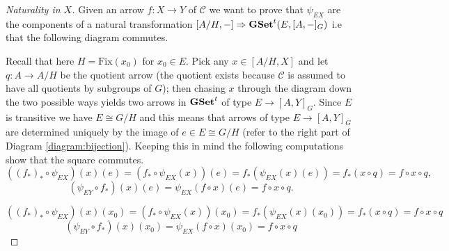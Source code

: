 \documentclass[italian, 12pt, reqno]{article}
\theoremstyle{myteo}
\numberwithin{equation}{section}
\newcommand{\cat}[1]{\mathscr{#1}}
\newcommand{\tgset}{\text{\textbf{GSet}}^t}
\newcommand{\fix}[1]{\text{Fix}(#1)}
\newcommand{\homs}[2]{[#1, #2]}
\newcommand{\fun}[3]{#1\colon#2\to #3}
\begin{document}
\begin{proof}[Naturality in \(X\)]
  \label{proof:naturality_in_X}
  Given an arrow \(\fun{f}{X}{Y}\) of \(\cat{C}\) we want to prove that \(\psi_{EX}\) are the components of a natural transformation \(\homs{A/H}{-}\Rightarrow \tgset(E, \homs{A}{-}_G)\) i.e that the following diagram commutes.
  \begin{center}
  \end{center}
  Recall that here \(H = \fix{x_0}\) for \(x_0\in E\).
  Pick any \(x\in \homs{A/H}{X}\) and let \(\fun{q}{A}{A/H}\) be the quotient arrow (the quotient exists because \(\cat{C}\) is assumed to have all quotients by subgroups of \(G\)); then chasing \(x\) through the diagram down the two possible ways yields two arrows in \(\tgset\) of type \(E\to\homs{A}{Y}_G\).
  Since \(E\) is transitive we have \(E \cong G/H\) and this means that arrows of type \(E\to\homs{A}{Y}_G\) are determined uniquely by the image of \(e\in E \cong G/H\) (refer to the right part of Diagram \ref{diagram:bijection}).
  Keeping this in mind the following computations show that the square commutes.
  \[((f_*)_*\circ \psi_{EX})(x)(e) = (f_*\circ \psi_{EX}(x))(e) = f_*(\psi_{EX}(x)(e)) = f_*(x \circ q) = f\circ x\circ q,\]
  \[(\psi_{EY}\circ f_*)(x)(e) = \psi_{EX}(f\circ x)(e) = f\circ x\circ q.\]

  \[((f_*)_*\circ \psi_{EX})(x)(x_0) = (f_*\circ \psi_{EX}(x))(x_0) = f_*(\psi_{EX}(x)(x_0)) = f_*(x\circ q) = f\circ x\circ q\]
  \[(\psi_{EY}\circ f_*)(x)(x_0) = \psi_{EX}(f\circ x)(x_0) = f\circ x\circ q\]
\end{proof}
\end{document}
